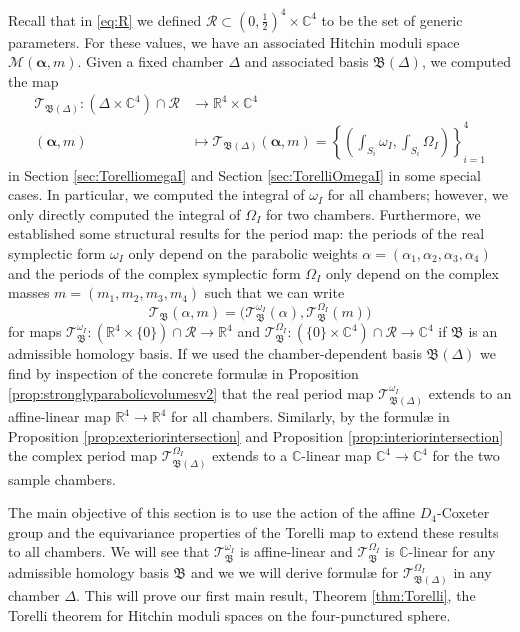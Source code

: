 \documentclass[12pt,letterpaper,reqno]{amsart}
\def\bm#1{#1}%
\def\mathbf#1{#1}%
\theoremstyle{remark}
\theoremstyle{definition}
\numberwithin{thm}{section}
\numberwithin{equation}{section}
\numberwithin{figure}{section}
\newcommand{\R}{\ensuremath{\mathbb R}}
\newcommand{\C}{\ensuremath{\mathbb C}}
\newcommand{\bfalpha}{\ensuremath{\bm \alpha}}
\newcommand{\bfm}{\mathbf{m}}
\newcommand{\Simplex}{\Delta}
\begin{document}
\smallskip

Recall that in \eqref{eq:R} we defined $\mathcal{R} \subset (0, \frac{1}{2})^4 \times \C^4$ to be the set of generic parameters. For these values, we have an associated Hitchin moduli space $\mathcal{M}(\boldsymbol{\alpha}, \mathbf{m})$. Given a fixed chamber $\Simplex $ and associated basis $\mathfrak{B}(\Simplex)$, we computed the map
\begin{align*}
\mathcal{T}_{\mathfrak{B}(\Simplex)}: (\Simplex \times \C^4) \cap \mathcal{R} &\longrightarrow \mathbb{R}^4 \times \C^4\\ \nonumber 
(\boldsymbol{\alpha}, \mathbf{m})   &\longmapsto \mathcal{T}_{\mathfrak{B}(\Simplex)}(\boldsymbol{\alpha}, \mathbf{m})=\left\{\left( \int_{S_i} \omega_I, \int_{S_i} \Omega_I \right)\right\}_{i=1}^4
\end{align*}
in Section \ref{sec:TorelliomegaI} and  Section \ref{sec:TorelliOmegaI} in some special cases. In particular, we computed the integral of $\omega_I$ for all chambers; however, we only directly computed the integral of $\Omega_I$ for two chambers. Furthermore, we established some structural results for the period map: the periods of the real symplectic form $\omega_I$ only depend on the parabolic weights $\bfalpha=(\alpha_1, \alpha_2, \alpha_3, \alpha_4)$ and the periods of the complex symplectic form $\Omega_I$ only depend on the complex masses $\bfm = (m_1, m_2, m_3, m_4)$ such that we can write
\[
\mathcal{T}_{\mathfrak{B}}(\bfalpha, \bfm) = \bigl(\mathcal{T}_{\mathfrak{B}}^{\omega_I}(\bfalpha), \mathcal{T}_{\mathfrak{B}}^{\Omega_I}(\bfm) \bigr)
\]
for maps $\mathcal{T}_{\mathfrak{B}}^{\omega_I}: (\R^4 \times \{\mathbf{0}\}    ) \cap \mathcal{R} \to \R^4$ and  $\mathcal{T}_{\mathfrak{B}}^{\Omega_I}: ( \{\mathbf{0}\} \times \C^4    ) \cap \mathcal{R} \to \C^4$ if $\mathfrak{B}$ is an admissible homology basis. If we used the chamber-dependent basis $\mathfrak{B}(\Simplex)$ we find by inspection of the concrete formul{\ae} in Proposition \ref{prop:stronglyparabolicvolumesv2} that the real period map $\mathcal{T}_{\mathfrak{B}(\Simplex)}^{\omega_I}$ extends to an affine-linear map $\R^4 \to \R^4$ for all chambers. Similarly, by the formul{\ae} in Proposition \ref{prop:exteriorintersection} and Proposition \ref{prop:interiorintersection} the complex period map  $\mathcal{T}_{\mathfrak{B}(\Simplex)}^{\Omega_I}$ extends to a $\C$-linear map $\C^4 \to \C^4$ for the two sample chambers.

\smallskip

The main objective of this section is to use the action of the affine $D_4$-Coxeter group and the equivariance properties of the Torelli map  to extend these results to all chambers. We will see that $\mathcal{T}_{\mathfrak{B}}^{\omega_I}$ is affine-linear and $\mathcal{T}_{\mathfrak{B}}^{\Omega_I}$ is $\C$-linear for any admissible  homology basis $\mathfrak{B}$ and we we will derive formul{\ae} for $\mathcal{T}_{\mathfrak{B}(\Simplex)}^{\Omega_I}$ in any chamber $\Delta$. This will prove our first  main result, Theorem \ref{thm:Torelli}, the Torelli theorem for Hitchin moduli spaces on the four-punctured sphere.
\end{document}
